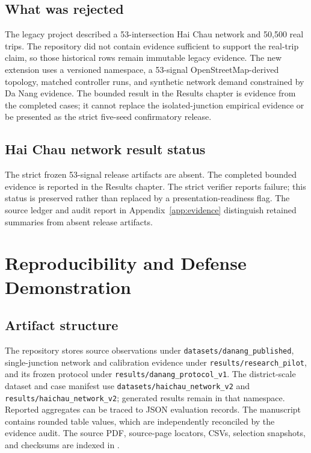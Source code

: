 \documentclass[12pt,a4paper]{report}
\begin{document}
\section{What was rejected}
The legacy project described a 53-intersection Hai Chau network and 50,500 real trips. The repository did not contain evidence sufficient to support the real-trip claim, so those historical rows remain immutable legacy evidence. The new extension uses a versioned namespace, a 53-signal OpenStreetMap-derived topology, matched controller runs, and synthetic network demand constrained by Da Nang evidence. The bounded result in the Results chapter is evidence from the completed cases; it cannot replace the isolated-junction empirical evidence or be presented as the strict five-seed confirmatory release.

\section{Hai Chau network result status}
The strict frozen 53-signal release artifacts are absent. The completed bounded evidence is reported in the Results chapter. The strict verifier reports failure; this status is preserved rather than replaced by a presentation-readiness flag. The source ledger and audit report in Appendix~\ref{app:evidence} distinguish retained summaries from absent release artifacts.

\chapter{Reproducibility and Defense Demonstration}\label{ch:reproducibility}

\section{Artifact structure}
The repository stores source observations under \texttt{datasets/danang\_published}, single-junction network and calibration evidence under \texttt{results/research\_pilot}, and its frozen protocol under \texttt{results/danang\_protocol\_v1}. The district-scale dataset and case manifest use \texttt{datasets/haichau\_network\_v2} and \texttt{results/haichau\_network\_v2}; generated results remain in that namespace. Reported aggregates can be traced to JSON evaluation records. The manuscript contains rounded table values, which are independently reconciled by the evidence audit. The source PDF, source-page locators, CSVs, selection snapshots, and checksums are indexed in .
\end{document}
